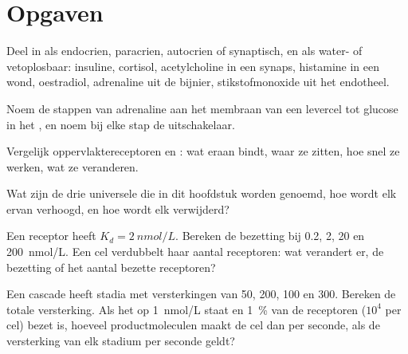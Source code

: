 \section{Opgaven}

\begin{exercise}[$\star$]\label{exo:b2:cell-signalling:1}
Deel in als endocrien, paracrien, autocrien of synaptisch, en als water- of
vetoplosbaar: insuline, cortisol, acetylcholine in een synaps, histamine in
een wond, oestradiol, adrenaline uit de bijnier, stikstofmonoxide uit het
endotheel.
\end{exercise}

\begin{exercise}[$\star$]\label{exo:b2:cell-signalling:2}
Noem de stappen van adrenaline aan het membraan van een levercel tot glucose in
het , en noem bij elke stap de uitschakelaar.
\end{exercise}

\begin{exercise}[$\star$]\label{exo:b2:cell-signalling:3}
Vergelijk oppervlaktereceptoren en : wat eraan bindt, waar ze
zitten, hoe snel ze werken, wat ze veranderen.
\end{exercise}

\begin{exercise}[$\star$]\label{exo:b2:cell-signalling:4}
Wat zijn de drie universele  die in dit hoofdstuk
worden genoemd, hoe wordt elk ervan verhoogd, en hoe wordt elk verwijderd?
\end{exercise}

\begin{exercise}[$\star\star$]\label{exo:b2:cell-signalling:5}
Een receptor heeft $K_d = \qty{2}{nmol/L}$. Bereken de bezetting bij
0.2, 2, 20 en \qty{200}{nmol/L}. Een cel verdubbelt haar aantal receptoren:
wat verandert er, de bezetting of het aantal bezette receptoren?
\end{exercise}

\begin{exercise}[$\star\star$]\label{exo:b2:cell-signalling:6}
Een cascade heeft stadia met versterkingen van 50, 200, 100 en 300. Bereken
de totale versterking. Als het  op \qty{1}{nmol/L} staat en
\qty{1}{\%} van de receptoren ($10^{4}$ per cel) bezet is, hoeveel
productmoleculen maakt de cel dan per seconde, als de versterking van elk
stadium per seconde geldt?
\end{exercise}

